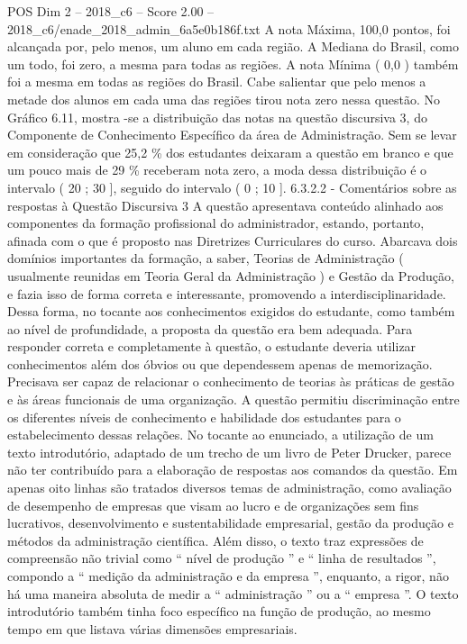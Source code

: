 \begin{textsample}{POS Dim 2 – 2018\_c6 – Score 2.00 – 2018\_c6/enade\_2018\_admin\_6a5e0b186f.txt}
A nota Máxima, 100,0 pontos, foi alcançada por, pelo menos, um aluno em cada região.
A Mediana do Brasil, como um todo, foi zero, a mesma para todas as regiões.
A nota Mínima ( 0,0 ) também foi a mesma em todas as regiões do Brasil.
Cabe salientar que pelo menos a metade dos alunos em cada uma das regiões tirou nota zero nessa questão.
No Gráfico 6.11, mostra -se a distribuição das notas na questão discursiva 3, do Componente de Conhecimento Específico da área de Administração.
Sem se levar em consideração que 25,2 \% dos estudantes deixaram a questão em branco e que um pouco mais de 29 \% receberam nota zero, a moda dessa distribuição é o intervalo ( 20 ; 30 ], seguido do intervalo ( 0 ; 10 ]. 6.3.2.2 - Comentários sobre as respostas à Questão Discursiva 3 A questão apresentava conteúdo alinhado aos componentes da formação profissional do administrador, estando, portanto, afinada com o que é proposto nas Diretrizes Curriculares do curso.
Abarcava dois domínios importantes da formação, a saber, Teorias de Administração ( usualmente reunidas em Teoria Geral da Administração ) e Gestão da Produção, e fazia isso de forma correta e interessante, promovendo a interdisciplinaridade.
Dessa forma, no tocante aos conhecimentos exigidos do estudante, como também ao nível de profundidade, a proposta da questão era bem adequada.
Para responder correta e completamente à questão, o estudante deveria utilizar conhecimentos além dos óbvios ou que dependessem apenas de memorização.
Precisava ser capaz de relacionar o conhecimento de teorias às práticas de gestão e às áreas funcionais de uma organização.
A questão permitiu discriminação entre os diferentes níveis de conhecimento e habilidade dos estudantes para o estabelecimento dessas relações.
No tocante ao enunciado, a utilização de um texto introdutório, adaptado de um trecho de um livro de Peter Drucker, parece não ter contribuído para a elaboração de respostas aos comandos da questão.
Em apenas oito linhas são tratados diversos temas de administração, como avaliação de desempenho de empresas que visam ao lucro e de organizações sem fins lucrativos, desenvolvimento e sustentabilidade empresarial, gestão da produção e métodos da administração científica.
Além disso, o texto traz expressões de compreensão não trivial como “ nível de produção ” e “ linha de resultados ”, compondo a “ medição da administração e da empresa ”, enquanto, a rigor, não há uma maneira absoluta de medir a “ administração ” ou a “ empresa ”.
O texto introdutório também tinha foco específico na função de produção, ao mesmo tempo em que listava várias dimensões empresariais.

\end{textsample}
